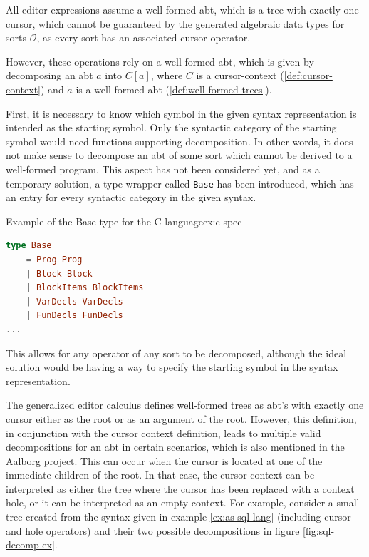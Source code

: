 All editor expressions assume a well-formed abt, which is a tree
with exactly one cursor, which cannot be guaranteed by the generated
algebraic data types for sorts $\mathcal{O}$, as every sort has an associated cursor operator.

However, these operations rely on a well-formed abt, which is given
by decomposing an abt $a$ into $C[\dot{a}]$, where $C$ is a
cursor-context (\cref{def:cursor-context}) and $\dot{a}$ is a
well-formed abt (\cref{def:well-formed-trees}).

First, it is necessary to know which symbol in the given syntax representation
is intended as the starting symbol. Only the syntactic category of the starting symbol
would need functions supporting decomposition.
In other words, it does not make sense to decompose an abt of some sort which
cannot be derived to a well-formed program.
This aspect has not been considered yet, and as a temporary solution,
a type wrapper called \texttt{Base} has been introduced, which has an entry for
every syntactic category in the given syntax.

\begin{example}{Example of the Base type for the C language}{ex:c-spec}
  \begin{lstlisting}[language=elm,style=examplestyle]
type Base
    = Prog Prog
    | Block Block
    | BlockItems BlockItems
    | VarDecls VarDecls
    | FunDecls FunDecls
...
\end{lstlisting}
\end{example}

This allows for any operator
of any sort to be decomposed, although the ideal solution would be having
a way to specify the starting symbol in the syntax representation.

The generalized editor calculus\cite{aalborg} defines well-formed trees as abt's
with exactly one cursor either as the root or as an argument of the root.
However, this definition, in conjunction with the cursor context definition,
leads to multiple valid decompositions for an abt in certain scenarios,
which is also mentioned in the Aalborg project\cite{aalborg}. This can occur when the cursor is located
at one of the immediate children of the root. In that case, the cursor context
can be interpreted as either the tree where the cursor has been replaced with a
context hole, or it can be interpreted as an empty context.
For example, consider a small tree created from the syntax given in
example \cref{ex:as-sql-lang} (including cursor and hole operators) and
their two possible decompositions in figure \cref{fig:sql-decomp-ex}.


